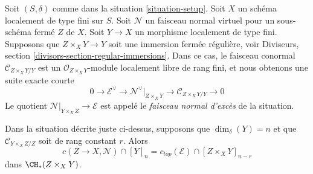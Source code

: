 \noindent
Soit $(S, \delta)$ comme dans la situation \ref{situation-setup}. Soit $X$ un schéma
localement de type fini sur $S$. Soit $\mathcal{N}$ un faisceau normal virtuel
pour un sous-schéma fermé $Z$ de $X$. Soit $Y \to X$ un morphisme
localement de type fini. Supposons que $Z \times_X Y \to Y$ soit une
immersion fermée régulière, voir
Diviseurs, section \ref{divisors-section-regular-immersions}.
Dans ce cas, le faisceau conormal $\mathcal{C}_{Z \times_X Y/Y}$ est un
$\mathcal{O}_{Z \times_X Y}$-module localement libre de rang fini, et nous obtenons une suite
exacte courte
$$
0 \to \mathcal{E}^\vee \to
\mathcal{N}^\vee|_{Z \times_X Y} \to \mathcal{C}_{Z \times_X Y/Y} \to 0
$$
Le quotient $\mathcal{N}|_{Y \times_X Z} \to \mathcal{E}$ est appelé le
{\it faisceau normal d'excès} de la situation.

\begin{lemma}
\label{lemma-gysin-fundamental}
Dans la situation décrite juste ci-dessus, supposons que $\dim_\delta(Y) = n$
et que $\mathcal{C}_{Y \times_X Z/Z}$ soit de rang constant $r$.
Alors
$$
c(Z \to X, \mathcal{N}) \cap [Y]_n =
c_{top}(\mathcal{E}) \cap [Z \times_X Y]_{n - r}
$$
dans $\CH_*(Z \times_X Y)$.
\end{lemma}

